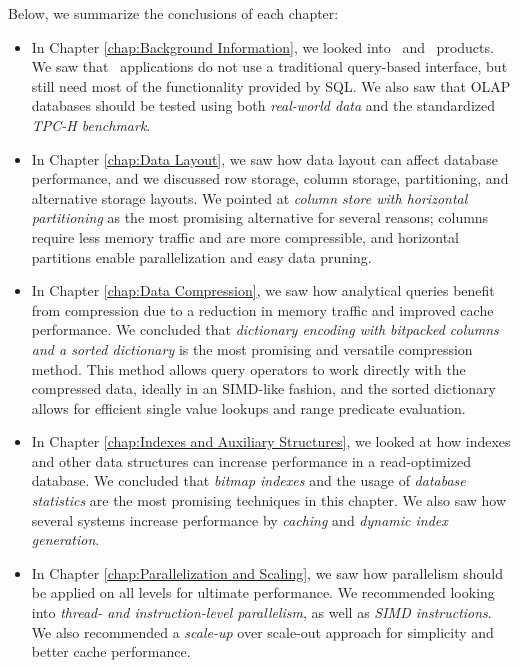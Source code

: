 Below, we summarize the conclusions of each chapter:
\begin{itemize}
  \item In Chapter \ref{chap:Background Information}, we looked into \bi~and \bd~products. We saw that \bd~applications do not use a traditional query-based interface, but still need most of the functionality provided by SQL. We also saw that OLAP databases should be tested using both \textit{real-world data} and the standardized \textit{TPC-H benchmark}.

  \item In Chapter \ref{chap:Data Layout}, we saw how data layout can affect database performance, and we discussed row storage, column storage, partitioning, and alternative storage layouts. We pointed at \textit{column store with horizontal partitioning} as the most promising alternative for several reasons; columns require less memory traffic and are more compressible, and horizontal partitions enable parallelization and easy data pruning.

  \item In Chapter \ref{chap:Data Compression}, we saw how analytical queries benefit from compression due to a reduction in memory traffic and improved cache performance. We concluded that \textit{dictionary encoding with bitpacked columns and a sorted dictionary} is the most promising and versatile compression method. This method allows query operators to work directly with the compressed data, ideally in an SIMD-like fashion, and the sorted dictionary allows for efficient single value lookups and range predicate evaluation.
    
  \item In Chapter \ref{chap:Indexes and Auxiliary Structures}, we looked at how indexes and other data structures can increase performance in a read-optimized database. We concluded that \textit{bitmap indexes} and the usage of \textit{database statistics} are the most promising techniques in this chapter. We also saw how several systems increase performance by \textit{caching} and \textit{dynamic index generation}.

  \item In Chapter \ref{chap:Parallelization and Scaling}, we saw how parallelism should be applied on all levels for ultimate performance. We recommended looking into \textit{thread- and instruction-level parallelism}, as well as \textit{SIMD instructions}. We also recommended a \textit{scale-up} over scale-out approach for simplicity and better cache performance.


\end{itemize}
